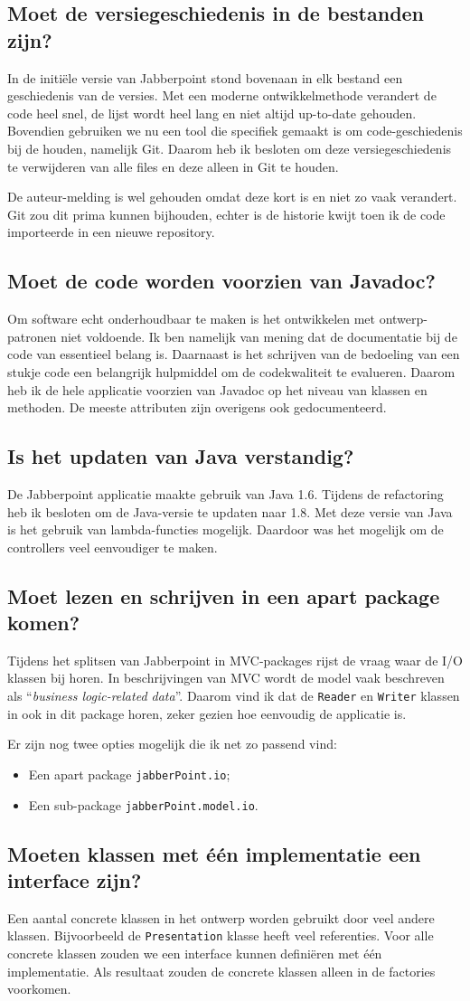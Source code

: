 \documentclass[a4paper]{article}
\newcommand{\question}[1]{
  \subsection{#1}
}
\newcommand{\code}[1]{\lstinline[columns=fixed]{#1}}
\begin{document}
    \question{Moet de versiegeschiedenis in de bestanden zijn?}
		In de initiële versie van Jabberpoint stond bovenaan in elk bestand een geschiedenis van de versies.
		Met een moderne ontwikkelmethode verandert de code heel snel, de lijst wordt heel lang en niet altijd up-to-date gehouden.
		Bovendien gebruiken we nu een tool die specifiek gemaakt is om code-geschiedenis bij de houden, namelijk Git.
		Daarom heb ik besloten om deze versiegeschiedenis te verwijderen van alle files en deze alleen in Git te houden.

		De auteur-melding is wel gehouden omdat deze kort is en niet zo vaak verandert.
		Git zou dit prima kunnen bijhouden, echter is de historie kwijt toen ik de code importeerde in een nieuwe repository.

    \question{Moet de code worden voorzien van Javadoc?}
		Om software echt onderhoudbaar te maken is het ontwikkelen met ontwerp-patronen niet voldoende.
		Ik ben namelijk van mening dat de documentatie bij de code van essentieel belang is.
		Daarnaast is het schrijven van de bedoeling van een stukje code een belangrijk hulpmiddel om de codekwaliteit te evalueren.
		Daarom heb ik de hele applicatie voorzien van Javadoc op het niveau van klassen en methoden.
		De meeste attributen zijn overigens ook gedocumenteerd.

	\question{Is het updaten van Java verstandig?}
		De Jabberpoint applicatie maakte gebruik van Java 1.6.
		Tijdens de refactoring heb ik besloten om de Java-versie te updaten naar 1.8.
		Met deze versie van Java is het gebruik van lambda-functies mogelijk.
		Daardoor was het mogelijk om de controllers veel eenvoudiger te maken.

	\question{Moet lezen en schrijven in een apart package komen?}
		Tijdens het splitsen van Jabberpoint in MVC-packages rijst de vraag waar de I/O klassen bij horen.
		In beschrijvingen van MVC wordt de model vaak beschreven als ``\textit{business logic-related data}''.
		Daarom vind ik dat de \code{Reader} en \code{Writer} klassen in ook in dit package horen, zeker gezien hoe eenvoudig de applicatie is.

		Er zijn nog twee opties mogelijk die ik net zo passend vind:
		\begin{itemize}
			\item Een apart package \code{jabberPoint.io};
			\item Een sub-package \code{jabberPoint.model.io}.
		\end{itemize}

	\question{Moeten klassen met één implementatie een interface zijn?}
		Een aantal concrete klassen in het ontwerp worden gebruikt door veel andere klassen.
		Bijvoorbeeld de \code{Presentation} klasse heeft veel referenties.
		Voor alle concrete klassen zouden we een interface kunnen definiëren met één implementatie.
		Als resultaat zouden de concrete klassen alleen in de factories voorkomen.
\end{document}
